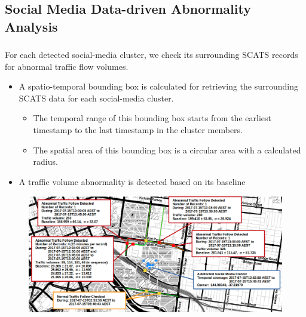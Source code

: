 \subsection{Social Media Data-driven Abnormality Analysis}
\begin{frame}
    \frametitle{}
	 For each detected social-media cluster, we check its surrounding SCATS records for abnormal traffic flow volumes. 
	 \begin{itemize} \small
	       \item A spatio-temporal bounding box is calculated for retrieving the surrounding SCATS data for each social-media cluster.
	       \begin{itemize} \tiny
	            \item The temporal range of this bounding box starts from the earliest timestamp to the last timestamp in the cluster members.
	            \item The spatial area of this bounding box is a circular area with a calculated radius.
	        \end{itemize}
	        \item A traffic volume abnormality is detected based on its baseline
	 \end{itemize}
	 \vspace{-0.15cm}
	 \begin{figure}
    	\centering
        \includegraphics[width=.9\textwidth]{resource/figures/casestudy2_exp.png}
    \end{figure}
\end{frame}


